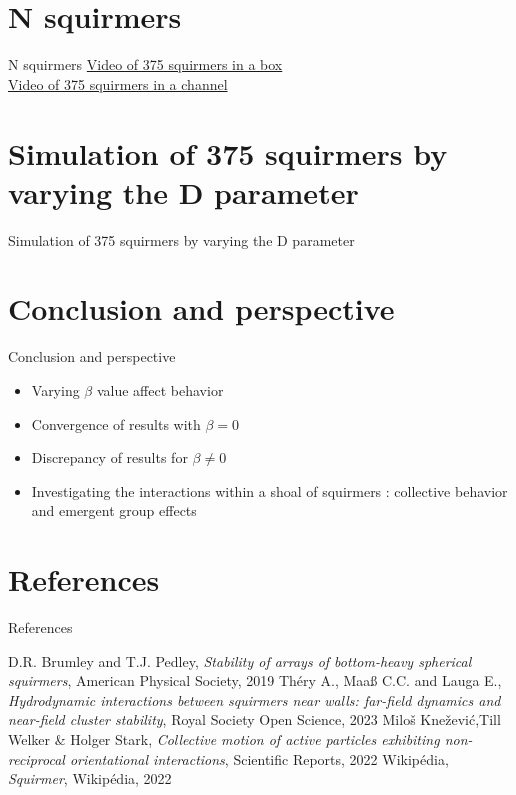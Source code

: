 \documentclass{beamer}
\begin{document}
\section{N squirmers}
\begin{frame}{N squirmers}
    \href{https://youtu.be/Uy90m-Cd2AA}{Video of 375 squirmers in a box}\\
    \href{https://www.youtube.com/watch?v=wKGb-HLe0Ik}{Video of 375 squirmers in a channel}
\end{frame}

\section{Simulation of 375 squirmers by varying the D parameter}
\begin{frame}{Simulation of 375 squirmers by varying the D parameter}
    
\end{frame}

\section{Conclusion and perspective}
\begin{frame}{Conclusion and perspective}
    \begin{center}
        \begin{itemize}
            \item Varying $\beta$ value affect behavior
            \item Convergence of results with $\beta = 0$
            \item Discrepancy of results for $\beta \ne 0$
            \item Investigating the interactions within a shoal of squirmers : collective behavior and emergent group effects
        \end{itemize}
    \end{center}
\end{frame}

\section{References}
\begin{frame}{References}
    \begin{thebibliography}{}
         D.R. Brumley and T.J. Pedley, \emph{Stability of arrays of bottom-heavy spherical squirmers}, American Physical Society, 2019
         Théry A., Maaß C.C. and Lauga E., \emph{Hydrodynamic interactions between squirmers near walls: far-field dynamics and near-field cluster stability}, Royal Society Open Science, 2023
         Miloš Knežević,Till Welker \& Holger Stark, \emph{Collective motion of active particles exhibiting non-reciprocal orientational interactions}, Scientific Reports, 2022
         Wikipédia, \emph{Squirmer}, Wikipédia, 2022
    \end{thebibliography}
\end{frame}
\end{document}
